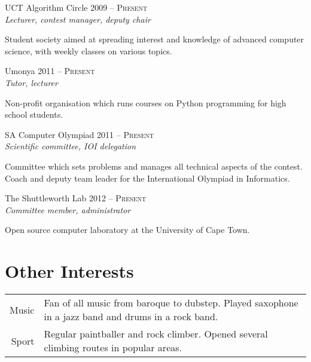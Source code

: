 \documentclass[a4paper,10pt]{article} %
\begin{document}
\begin{minipage}[t]{0.44\textwidth}
{\raggedright{\large UCT Algorithm Circle} \hfill \textsc{2009 -- Present}\\
\textit{Lecturer, contest manager, deputy chair}\\[5pt]}

\normalsize{Student society aimed at spreading interest and knowledge of advanced computer science, with weekly classes on various topics.}\\


{\raggedright{\large Umonya} \hfill \textsc{2011 -- Present}\\
\textit{Tutor, lecturer}\\[5pt]}

\normalsize{Non-profit organisation which runs courses on Python programming for high school students.}\\


{\raggedright{\large SA Computer Olympiad} \hfill \textsc{2011 -- Present}\\
\textit{Scientific committee, IOI delegation}\\[5pt]}

\normalsize{Committee which sets problems and manages all technical aspects of the contest.
Coach and deputy team leader for the International Olympiad in Informatics.}\\


{\raggedright{\large The Shuttleworth Lab} \hfill \textsc{2012 -- Present}\\
\textit{Committee member, administrator}\\[5pt]}

\normalsize{Open source computer laboratory at the University of Cape Town.}\\


\section{Other Interests}

\begin{tabularx}{\linewidth}{rX}
Music & Fan of all music from baroque to dubstep.
        Played saxophone in a jazz band and drums in a rock band.\\[5pt]
Sport & Regular paintballer and rock climber.  Opened several climbing routes in popular areas.
\end{tabularx}

\end{minipage} %
\end{document}
